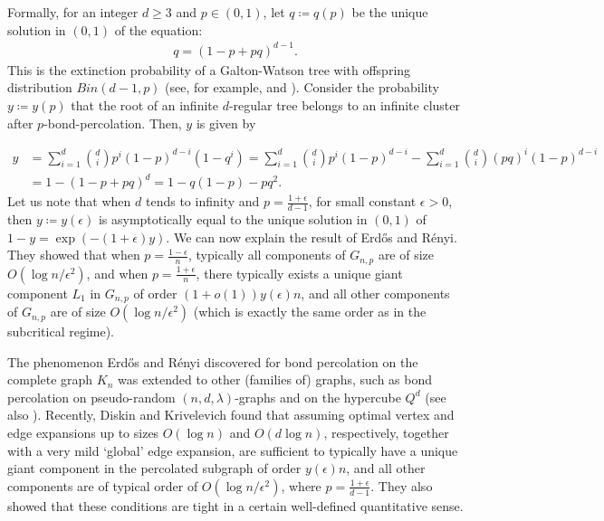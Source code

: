\documentclass[notitlepage]{scrartcl}
\begin{document}
Formally, for an integer $d \geq 3$ and $p \in (0, 1)$, let $q \coloneqq q(p)$ be the unique solution in $(0, 1)$ of the equation:
\begin{align*}
    q=(1-p+pq)^{d-1}.
\end{align*}
This is the extinction probability of a Galton-Watson tree with offspring distribution $Bin(d - 1, p)$ (see, for example, \cite{zbMATH03410334} and \cite[Section 4.3.4]{zbMATH06976511}). Consider the probability $y \coloneqq y(p)$ that the root of an infinite $d$-regular tree
belongs to an infinite cluster after $p$-bond-percolation. Then, $y$ is given by

\begin{equation*}
\begin{split}
    y&=\sum_{i=1}^d \binom{d}{i}p^i(1-p)^{d-i}(1-q^i)=
    \sum_{i=1}^d \binom{d}{i}p^i(1-p)^{d-i}-\sum_{i=1}^d \binom{d}{i}(pq)^i(1-p)^{d-i}\\
    &=1-(1-p+pq)^d=1-q(1-p)-pq^2.
\end{split}
\end{equation*}
Let us note that when $d$ tends to infinity and $p=\frac{1+\epsilon}{d-1}$, for small constant $\epsilon>0$, then $y\coloneqq y(\epsilon)$ is asymptotically equal to the unique solution in $(0,1)$ of $1-y=\exp(-(1+\epsilon)y)$.
We can now explain the result of Erd\H os and R\'enyi. They showed that when $p=\frac{1-\epsilon}{n}$, typically all components of $G_{n,p}$ are of size $O(\log n/\epsilon^2)$, and when $p=\frac{1+\epsilon}{n}$, there typically exists a unique giant component $L_1$ in $G_{n,p}$ of order $(1 + o(1))y(\epsilon)n$, and all other components of $G_{n,p}$ are of size $O(\log n/\epsilon^2)$ (which is exactly the same order as in the subcritical regime).

The phenomenon Erd\H os and R\'enyi discovered for bond percolation on the complete graph $K_n$ was extended to other (families of) graphs, such as bond percolation on pseudo-random $(n,d,\lambda)$-graphs \cite{zbMATH02037533} and on the hypercube $Q^d$ \cite{zbMATH03769676,zbMATH00035138} (see also \cite{arXiv:2311.07210}). Recently, Diskin and Krivelevich \cite{zbMATH08098276,diskin2025componentslargesmalli} found that assuming optimal vertex and edge expansions up to sizes $O(\log n)$ and $O(d\log n)$, respectively, together with a very mild `global' edge expansion, are sufficient to typically have a unique giant component in the percolated subgraph of order $y(\epsilon)n$, and all other components are of typical order of $O(\log n/\epsilon^2)$, where $p=\frac{1+\epsilon}{d-1}$. They also showed that these conditions are tight in a certain well-defined quantitative sense.
\end{document}
